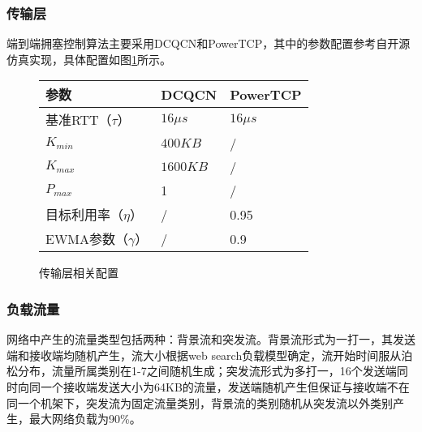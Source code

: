 \subsubsection{传输层}

端到端拥塞控制算法主要采用DCQCN\cite{SIGCOMM15DCQCN}和PowerTCP\cite{NSDI22PowerTCP}，其中的参数配置参考自开源仿真实现\cite{HPCCGitHub}，具体配置如图\ref{fig:c3:parameter setting in transport protocol}所示。

\begin{figure}[H]
  \begin{table}[H]
      \begin{tabularx}{\textwidth}{YYY}
      \toprule
          \textbf{参数} & \textbf{DCQCN} & \textbf{PowerTCP}\\
      \midrule
          基准RTT（$\tau$） & $16\mu s$ & $16\mu s$ \\
          $K_{min}$ & $400KB$ & / \\
          $K_{max}$ & $1600KB$ & / \\
          $P_{max}$ & 1 & / \\
          目标利用率（$\eta$） & / & 0.95 \\
          EWMA参数（$\gamma$） & / & 0.9 \\
      \bottomrule
      \end{tabularx}
  \end{table}
  \caption{传输层相关配置}
  \label{fig:c3:parameter setting in transport protocol}
\end{figure}

\subsubsection{负载流量}

网络中产生的流量类型包括两种：背景流和突发流。背景流形式为一打一，其发送端和接收端均随机产生，流大小根据web search\cite{SIGCOMM10DCTCP}负载模型确定，流开始时间服从泊松分布，流量所属类别在1-7之间随机生成；突发流形式为多打一，16个发送端同时向同一个接收端发送大小为64KB的流量，发送端随机产生但保证与接收端不在同一个机架下，突发流为固定流量类别，背景流的类别随机从突发流以外类别产生，最大网络负载为90\%。

